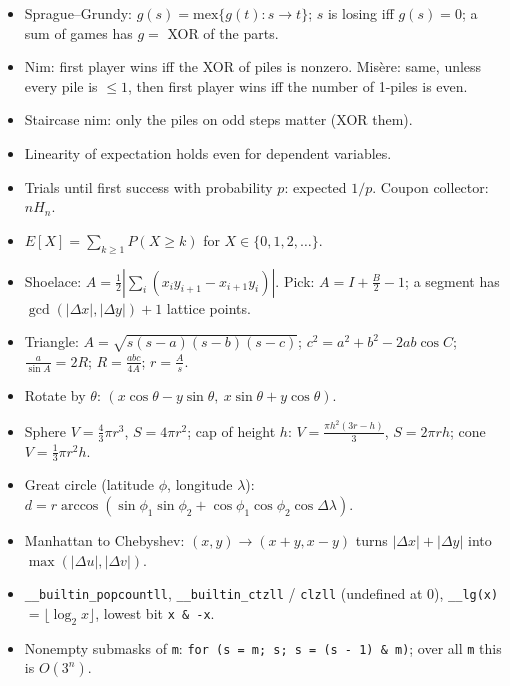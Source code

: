 {
\begin{itemize}
  \item Sprague–Grundy: $g(s) = \mathrm{mex}\{g(t) : s \to t\}$; $s$ is losing iff $g(s) = 0$;
        a sum of games has $g = $ XOR of the parts.
  \item Nim: first player wins iff the XOR of piles is nonzero. Misère: same, unless
        every pile is $\le 1$, then first player wins iff the number of 1-piles is even.
  \item Staircase nim: only the piles on odd steps matter (XOR them).
\end{itemize}

\begin{itemize}
  \item Linearity of expectation holds even for dependent variables.
  \item Trials until first success with probability $p$: expected $1/p$.
        Coupon collector: $n H_n$.
  \item $E[X] = \sum_{k \ge 1} P(X \ge k)$ for $X \in \{0, 1, 2, \dots\}$.
\end{itemize}

\begin{itemize}
  \item Shoelace: $A = \frac12 \left|\sum_i (x_i y_{i+1} - x_{i+1} y_i)\right|$.
        Pick: $A = I + \frac B2 - 1$; a segment has $\gcd(|\Delta x|, |\Delta y|) + 1$ lattice points.
  \item Triangle: $A = \sqrt{s(s-a)(s-b)(s-c)}$; $c^2 = a^2 + b^2 - 2ab\cos C$;
        $\frac{a}{\sin A} = 2R$; $R = \frac{abc}{4A}$; $r = \frac{A}{s}$.
  \item Rotate by $\theta$: $(x\cos\theta - y\sin\theta,\ x\sin\theta + y\cos\theta)$.
  \item Sphere $V = \frac43\pi r^3$, $S = 4\pi r^2$; cap of height $h$:
        $V = \frac{\pi h^2 (3r - h)}{3}$, $S = 2\pi r h$; cone $V = \frac13\pi r^2 h$.
  \item Great circle (latitude $\phi$, longitude $\lambda$):
        $d = r\arccos(\sin\phi_1\sin\phi_2 + \cos\phi_1\cos\phi_2\cos\Delta\lambda)$.
  \item Manhattan to Chebyshev: $(x, y) \to (x + y, x - y)$ turns $|\Delta x| + |\Delta y|$
        into $\max(|\Delta u|, |\Delta v|)$.
\end{itemize}

\begin{itemize}
  \item \texttt{\_\_builtin\_popcountll}, \texttt{\_\_builtin\_ctzll} / \texttt{clzll} (undefined at 0),
        \texttt{\_\_lg(x)} $= \lfloor\log_2 x\rfloor$, lowest bit \texttt{x \& -x}.
  \item Nonempty submasks of \texttt{m}: \texttt{for (s = m; s; s = (s - 1) \& m)};
        over all \texttt{m} this is $O(3^n)$.
\end{itemize}
\par}
